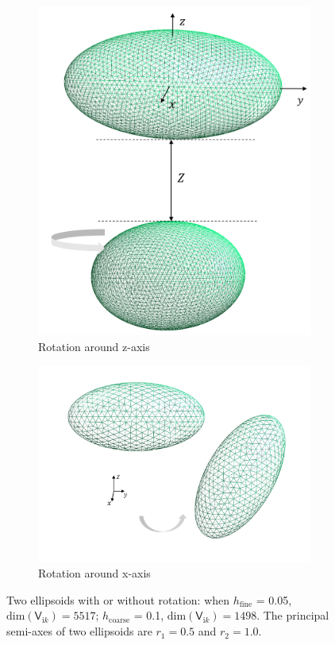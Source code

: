 \begin{figure}[H]
\begin{subfigure}[t]{.5\linewidth}
    \includegraphics[scale = 0.3]{figures/Ellipsoid_z_axis}
    \caption{Rotation around z-axis}
    \label{Rotation around z-axis}
    \end{subfigure}%
    \begin{subfigure}[t]{.5\linewidth}
    \centering
    \includegraphics[scale = 0.07]{figures/Ellipsoid_x_axis}
    \caption{Rotation around x-axis}
    \label{Rotation around x-axis}
    \end{subfigure}
    \caption{Two ellipsoids with or without rotation: when $h_\text{fine}$ = 0.05, $\text{dim}(\mathsf{V}_{\mathrm{i}k}) = 5517$; 
    $h_\text{coarse}$ = 0.1, $\text{dim}(\mathsf{V}_{\mathrm{i}k}) = 1498$. The principal semi-axes of two ellipsoids are $r_{1} = 0.5$ and $r_{2} = 1.0$.}
    \label{Two ellipsoids}
    \end{figure}

